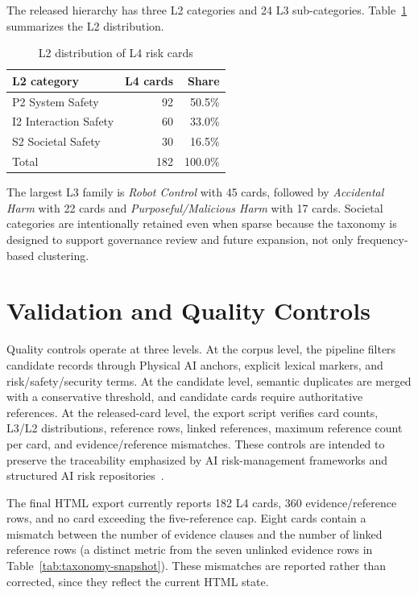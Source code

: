 \documentclass[11pt]{article}
\begin{document}
The released hierarchy has three L2 categories and 24 L3 sub-categories. Table~\ref{tab:l2dist} summarizes the L2 distribution.

\begin{table}[htbp]
\centering
\footnotesize
\caption{L2 distribution of L4 risk cards}
\label{tab:l2dist}
\begin{tabular}{lrr}
\toprule
L2 category & L4 cards & Share \\
\midrule
P2 System Safety & 92 & 50.5\% \\
I2 Interaction Safety & 60 & 33.0\% \\
S2 Societal Safety & 30 & 16.5\% \\
\midrule
Total & 182 & 100.0\% \\
\bottomrule
\end{tabular}
\end{table}

The largest L3 family is \textit{Robot Control} with 45 cards, followed by \textit{Accidental Harm} with 22 cards and \textit{Purposeful/Malicious Harm} with 17 cards. Societal categories are intentionally retained even when sparse because the taxonomy is designed to support governance review and future expansion, not only frequency-based clustering.

\section{Validation and Quality Controls}

Quality controls operate at three levels. At the corpus level, the pipeline filters candidate records through Physical AI anchors, explicit lexical markers, and risk/safety/security terms. At the candidate level, semantic duplicates are merged with a conservative threshold, and candidate cards require authoritative references. At the released-card level, the export script verifies card counts, L3/L2 distributions, reference rows, linked references, maximum reference count per card, and evidence/reference mismatches. These controls are intended to preserve the traceability emphasized by AI risk-management frameworks and structured AI risk repositories~\cite{nist-airmf,iso23894,slattery2024}.

The final HTML export currently reports 182 L4 cards, 360 evidence/reference rows, and no card exceeding the five-reference cap. Eight cards contain a mismatch between the number of evidence clauses and the number of linked reference rows (a distinct metric from the seven unlinked evidence rows in Table~\ref{tab:taxonomy-snapshot}). These mismatches are reported rather than corrected, since they reflect the current HTML state.
\end{document}

